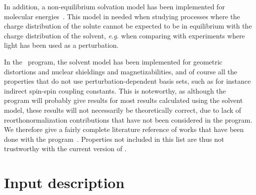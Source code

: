 In addition, a non-equilibrium
solvation model has been implemented
for molecular energies~\cite{kvmachahjajjcp103}. This model in needed
when studying processes where the charge distribution of the solute
cannot be expected to be in equilibrium with the charge distribution
of the solvent, {\it e.g.\/} when comparing with experiments where light has
been used as a perturbation.

In the \aba\ program, the solvent model has been implemented for
geometric distortions and nuclear shieldings and
magnetizabilities,
and of course all the
properties that do not use perturbation-dependent basis
sets, such as for
instance indirect spin-spin coupling 
constants. This is noteworthy, as
although the program will probably give results for most results
calculated using the solvent  model, these results will not
necessarily be theoretically correct, due to lack of reorthonormalization
contributions that have not been considered in the program. We
therefore give a fairly complete literature reference of works that
have been done with the
program~\cite{kvmpjkrthjcp106,poakvmkrthjpc100}. Properties not
included in this list are thus not trustworthy with the current
version of {\dalton}.

\section{Input description}\label{sec:solventinp}

